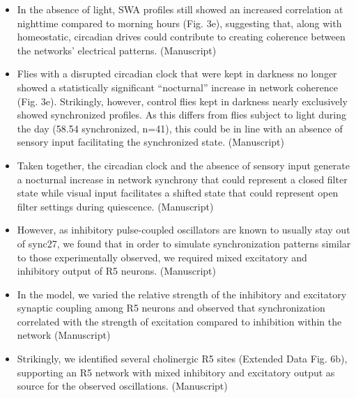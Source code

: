 \documentclass[11pt]{article}
\begin{document}
\begin{itemize}
    \item In
    the absence of light, SWA profiles still showed an increased correlation at nighttime compared
    to morning hours (Fig. 3e), suggesting that, along with homeostatic, circadian drives could
    contribute to creating coherence between the networks’ electrical patterns.
    \parencite{raccugliaCoherentMultilevelNetwork2022} (Manuscript)

    \item Flies with a disrupted circadian clock that were kept in
    darkness no longer showed a statistically significant “nocturnal” increase in network
    coherence (Fig. 3e). Strikingly, however, control flies kept in darkness nearly exclusively showed synchronized
    profiles. As this differs from flies subject to light during the day (58.54%
    synchronized, n=41), this could be in line with an absence of sensory input facilitating the
    synchronized state.
    \parencite{raccugliaCoherentMultilevelNetwork2022} (Manuscript)

    \item  Taken together, the circadian clock and the absence of sensory
    input generate a nocturnal increase in network synchrony that could represent a closed filter
    state while visual input facilitates a shifted state that could represent open filter settings
    during quiescence.
    \parencite{raccugliaCoherentMultilevelNetwork2022} (Manuscript)

    \item However, as inhibitory pulse-coupled
    oscillators are known to usually stay out of sync27, we found that in order to simulate
    synchronization patterns similar to those experimentally observed, we required mixed
    excitatory and inhibitory output of R5 neurons.
    \parencite{raccugliaCoherentMultilevelNetwork2022} (Manuscript)

    \item In the model, we
    varied the relative strength of the inhibitory and excitatory synaptic coupling among R5
    neurons and observed that synchronization correlated with the strength of excitation
    compared to inhibition within the network
    \parencite{raccugliaCoherentMultilevelNetwork2022} (Manuscript)

    \item Strikingly, we identified several cholinergic R5 sites (Extended Data Fig. 6b), supporting an R5
    network with mixed inhibitory and excitatory output as source for the observed oscillations.
    \parencite{raccugliaCoherentMultilevelNetwork2022} (Manuscript)


\end{itemize}
\end{document}
